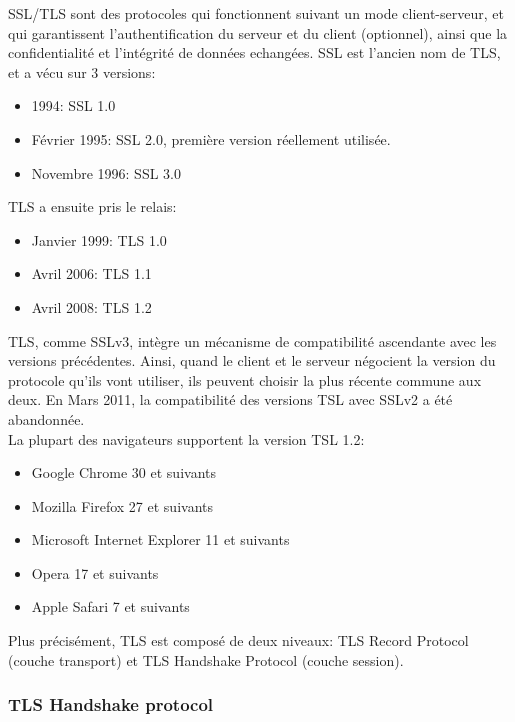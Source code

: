 SSL/TLS sont des protocoles qui fonctionnent suivant un mode client-serveur, et qui garantissent l'authentification du serveur et du client (optionnel), ainsi que la confidentialité et l'intégrité de données echangées. SSL est l'ancien nom de TLS, et a vécu sur 3 versions:
\begin{itemize}
\item 1994: SSL 1.0
\item Février 1995: SSL 2.0, première version réellement utilisée.
\item Novembre 1996: SSL 3.0 
\end{itemize}
TLS a ensuite pris le relais: 
\begin{itemize}
\item Janvier 1999: TLS 1.0
\item Avril 2006: TLS 1.1
\item Avril 2008: TLS 1.2
\end{itemize}
TLS, comme SSLv3, intègre un mécanisme de compatibilité ascendante avec les versions précédentes. Ainsi, quand le client et le serveur négocient la version du protocole qu'ils vont utiliser, ils peuvent choisir la plus récente commune aux deux. En Mars 2011, la compatibilité des versions TSL avec SSLv2 a été abandonnée. \\
La plupart des navigateurs supportent la version TSL 1.2:
\begin{itemize}
\item Google Chrome 30 et suivants
\item Mozilla Firefox 27 et suivants
\item Microsoft Internet Explorer 11 et suivants
\item Opera 17 et suivants
\item Apple Safari 7 et suivants
\end{itemize}
Plus précisément, TLS est composé de deux niveaux: TLS Record Protocol (couche transport) et TLS Handshake Protocol (couche session).

\subsubsection{TLS Handshake protocol}

